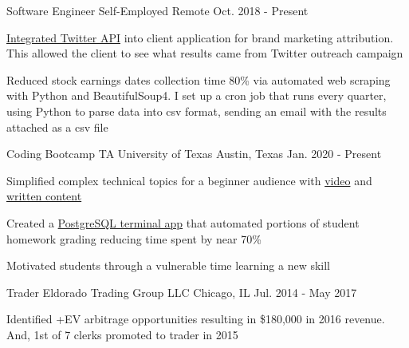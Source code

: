 

\begin{cventries}

  \cventry
    {Software Engineer} %
    {Self-Employed} %
    {Remote} %
    {Oct. 2018 - Present} %
    {
      \begin{cvitems} %
      \item {\href{https://github.com/geofflangenderfer/twittersearch}{Integrated Twitter API} into client application for brand marketing attribution. This allowed the client to see what results came from Twitter outreach campaign}
	\item {Reduced stock earnings dates collection time 80\% via automated web scraping with Python and BeautifulSoup4. I set up a cron job that runs every quarter, using Python to parse data into csv format, sending an email with the results attached as a csv file}
      \end{cvitems}
    }

  \cventry
    {Coding Bootcamp TA} %
    {University of Texas} %
    {Austin, Texas} %
    {Jan. 2020 - Present} %
    {
      \begin{cvitems} %
        \item {Simplified complex technical topics for a beginner audience with \href{https://youtu.be/G4tDjGUD-T4}{video} and \href{https://www.linkedin.com/pulse/how-deal-knowledge-work-frustration-geoff-langenderfer/?trackingId=Z6YGiHpVRFi4PCNxybaPfw\%3D\%3D}{written content}}
        \item {Created a \href{https://youtu.be/ELCZ5dAS6Zg}{PostgreSQL terminal app} that automated portions of student homework grading reducing time spent by near 70\%}
        \item {Motivated students through a vulnerable time learning a new skill}
      \end{cvitems}
    }

  \cventry
    {Trader} %
    {Eldorado Trading Group LLC} %
    {Chicago, IL} %
    {Jul. 2014 - May 2017} %
    {
      \begin{cvitems} %
        \item {Identified +EV arbitrage opportunities resulting in \$180,000 in 2016 revenue. And, 1st of 7 clerks promoted to trader in 2015}
      \end{cvitems}
    }

\end{cventries}
